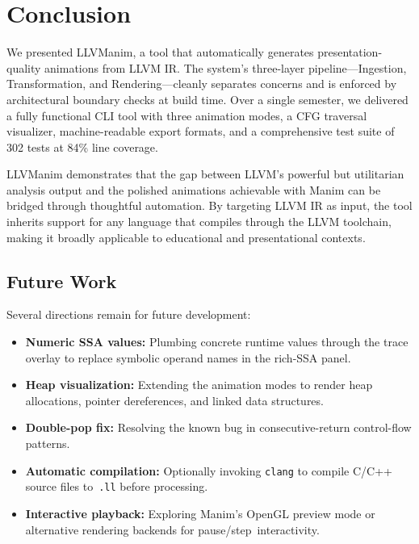 \section{Conclusion}
We presented LLVManim, a tool that automatically generates presentation-quality animations from LLVM IR. The system's three-layer pipeline---Ingestion, Transformation, and Rendering---cleanly separates concerns and is enforced by architectural boundary checks at build time. Over a single semester, we delivered a fully functional CLI tool with three animation modes, a CFG traversal visualizer, machine-readable export formats, and a comprehensive test suite of 302 tests at 84\% line coverage.

LLVManim demonstrates that the gap between LLVM's powerful but utilitarian analysis output and the polished animations achievable with Manim can be bridged through thoughtful automation. By targeting LLVM IR as input, the tool inherits support for any language that compiles through the LLVM toolchain, making it broadly applicable to educational and presentational contexts.

\subsection{Future Work}
Several directions remain for future development:
\begin{itemize}
    \item \textbf{Numeric SSA values:} Plumbing concrete runtime values through the trace overlay to replace symbolic operand names in the rich-SSA panel.
    \item \textbf{Heap visualization:} Extending the animation modes to render heap allocations, pointer dereferences, and linked data structures.
    \item \textbf{Double-pop fix:} Resolving the known bug in consecutive-return control-flow patterns.
    \item \textbf{Automatic compilation:} Optionally invoking \texttt{clang} to compile C/C++ source files to~\texttt{.ll} before processing.
    \item \textbf{Interactive playback:} Exploring Manim's OpenGL preview mode or alternative rendering backends for pause/step~interactivity.
\end{itemize}
